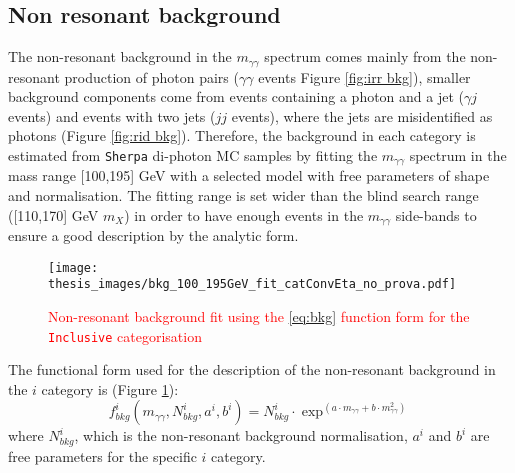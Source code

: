 \documentclass[a4paper, oneside, 11pt, openright]{book}
\begin{document}
 			\subsection{Non resonant background}
 				The non-resonant background in the $m_{\gamma\gamma}$ spectrum comes mainly from the non-resonant production of photon pairs ($\gamma\gamma$ events Figure \ref{fig:irr bkg}), smaller background components come from events containing a photon and a jet ($\gamma j$ events) and events with two jets ($jj$ events), where the jets are misidentified as photons (Figure \ref{fig:rid bkg}). Therefore, the background in each category is estimated from \texttt{Sherpa} di-photon MC samples by fitting the $m_{\gamma\gamma}$ spectrum in the mass range [100,195] GeV with a selected model with free parameters of shape and normalisation. The fitting range is set wider than the blind search range ([110,170] GeV $m_X$) in order to have enough events in the $m_{\gamma\gamma}$ side-bands to ensure a good description by the analytic form.
 				
 				\begin{figure}[h]
 					\centering
 					\texttt{[image: thesis\_images/bkg\_100\_195GeV\_fit\_catConvEta\_no\_prova.pdf]}
 					\caption{\textcolor{red}{Non-resonant background fit using the \ref{eq:bkg} function form for the \texttt{Inclusive} categorisation}}
 					\label{fig:bkg_fit}
 				\end{figure}
 				The functional form used for the description of the non-resonant background in the $i$ category is (Figure \ref{fig:bkg_fit}):
 				\begin{equation}\label{eq:bkg}
 					f^i_{bkg}(m_{\gamma\gamma},N_{bkg}^i,a^i,b^i) = N_{bkg}^i\cdot\exp^{(a\cdot m_{\gamma\gamma}+b\cdot m_{\gamma\gamma}^2)}
 				\end{equation}
 				where $N_{bkg}^i$, which is the non-resonant background normalisation, $a^i$ and $b^i$ are free parameters for the specific $i$ category.
 				
\end{document}
